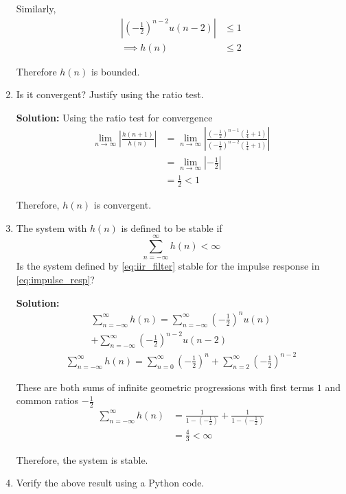 \documentclass[journal,12pt,twocolumn]{IEEEtran}
\newcommand{\solution}{\noindent \textbf{Solution: }}
\providecommand{\brak}[1]{\ensuremath{\left(#1\right)}}
\providecommand{\abs}[1]{\left\vert#1\right\vert}
\numberwithin{equation}{section}
\renewcommand\thesection{\arabic{section}}
\begin{document}
\begin{enumerate}[label=\thesection.\arabic*]
	Similarly,
	\begin{align}
		\abs{\brak{-\frac12}^{n-2} u(n-2)} &\le 1 \\
		\implies h(n) &\le 2
	\end{align}
	
	Therefore $h(n)$ is bounded.
	
	\item Is it convergent? Justify using the ratio test.
	
	\solution Using the ratio test for convergence
	\begin{align}
		\lim_{n \to \infty} \abs{\frac{h(n+1)}{h(n)}} &= \lim_{n \to \infty} \abs{\frac{\brak{-\frac12}^{n-1} \brak{\frac14 + 1}}{\brak{-\frac12}^{n-2} \brak{\frac14 + 1}}} \\
		&= \lim_{n \to \infty} \abs{-\frac12} \\
		&= \frac{1}{2} < 1
	\end{align}
	
	Therefore, $h(n)$ is convergent.
	
	\item The system with $h(n)$ is defined to be stable if
	\begin{equation}
		\sum_{n=-\infty}^{\infty}h(n) < \infty
	\end{equation}
	Is the system defined by \eqref{eq:iir_filter} stable for the impulse response in \eqref{eq:impulse_resp}?	
	
	\solution
	\begin{multline}
		\sum_{n=-\infty}^{\infty}h(n) = \sum_{n=-\infty}^{\infty} \brak{-\frac12}^n u(n) \\
		+ \sum_{n=-\infty}^{\infty} \brak{-\frac12}^{n-2} u(n-2)
	\end{multline}
	\begin{align}
		\sum_{n=-\infty}^{\infty}h(n) = \sum_{n=0}^{\infty}\brak{-\frac12}^n + \sum_{n=2}^{\infty}\brak{-\frac12}^{n-2}
	\end{align}
	
	These are both sums of infinite geometric progressions with first terms $1$ and common ratios $-\frac12$
	\begin{align}
		\sum_{n=-\infty}^{\infty}h(n) &= \frac{1}{1 - \brak{-\frac12}} + \frac{1}{1 - \brak{-\frac12}} \\
		&= \frac{4}{3} < \infty
	\end{align}
	
	Therefore, the system is stable. 
	
	\item Verify the above result using a Python code. 
	

\end{enumerate}
\end{document}
